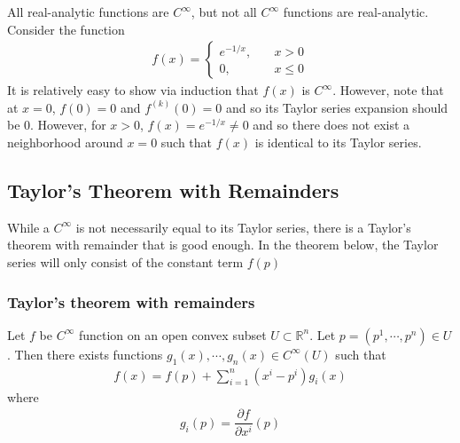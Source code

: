 \documentclass{article}
\newcommand{\R}{\mathbb{R}}
\begin{document}
	All real-analytic functions are $C^{\infty}$, but not all $C^{\infty}$ functions are real-analytic. Consider the function
	\begin{gather*}
		f(x) = \begin{cases}
			e^{-1/x}, \quad &x > 0 \\
			0, \quad &x \leq 0
		\end{cases}
	\end{gather*}
	It is relatively easy to show via induction that $f(x)$ is $C^{\infty}$. However, note that at $x = 0$, $f(0) = 0$ and $f^{(k)}(0) = 0$ and so its Taylor series expansion should be $0$. However, for $x > 0$, $f(x) = e^{-1/x} \neq 0$ and so there does not exist a neighborhood around $x = 0$ such that $f(x)$ is identical to its Taylor series.
	
	\subsection{Taylor's Theorem with Remainders}
	While a $C^{\infty}$ is not necessarily equal to its Taylor series, there is a Taylor's theorem with remainder that is good enough. In the theorem below, the Taylor series will only consist of the constant term $f(p)$
	
	\subsubsection*{Taylor's theorem with remainders}
	Let $f$ be $C^{\infty}$	function on an open convex subset $U \subset \R^n$. Let $p = (p^1, \cdots, p^n) \in U$. Then there exists functions $g_1(x), \cdots, g_n(x) \in C^{\infty}(U)$ such that
	\begin{gather*}
		f(x) = f(p) + \sum_{i=1}^{n} (x^i - p^i) g_i(x)
	\end{gather*}
	where
	\begin{gather*}
		g_i(p) = \dfrac{\partial f}{\partial x^i}(p)
	\end{gather*}
\end{document}
